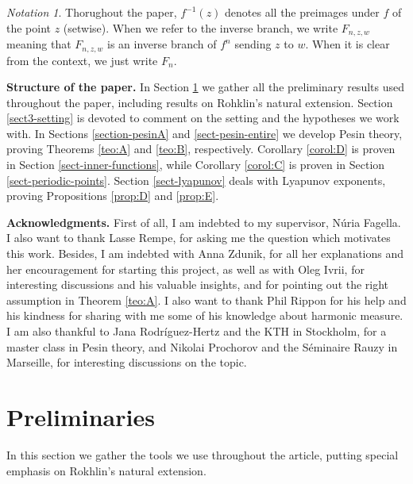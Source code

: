 \documentclass[11pt]{article}
\theoremstyle{definition}
\theoremstyle{remark}
\newtheorem*{notation*}{Notation}
\theoremstyle{plain}
\begin{document}
\begin{notation*}
	 Thorughout the paper, $ f^{-1}(z) $ denotes all the preimages under $ f $ of the point $ z $ (setwise). When we refer to the inverse branch, we write $ F_{n,z,w} $ meaning that $ F_{n,z,w}$ is an inverse branch   of $ f^{n} $ sending $ z $ to $ w $. When it is clear from the context, we  just write $ F_n $.
\end{notation*}


\vspace{0.2cm}
{\bf Structure of the paper.} In
Section \ref{section-preliminaries} we gather all the preliminary results used throughout the paper, including results on Rohklin's natural extension. Section \ref{sect3-setting} is devoted to comment on the setting and the hypotheses we work with.  In Sections \ref{section-pesinA} and \ref{sect-pesin-entire}  we develop  Pesin theory, proving Theorems \ref{teo:A} and \ref{teo:B}, respectively.  Corollary \ref{corol:D} is proven in Section \ref{sect-inner-functions}, while Corollary \ref{corol:C} is proven in Section \ref{sect-periodic-points}. Section \ref{sect-lyapunov} deals with Lyapunov exponents, proving Propositions \ref{prop:D} and \ref{prop:E}.

\vspace{0.2cm}
{\bf Acknowledgments.} First of all, I am indebted to my supervisor, Núria Fagella.
I also want to thank Lasse Rempe, for asking me the question which motivates this work. Besides, I am indebted with Anna Zdunik, for all her explanations and her encouragement for starting this project, as well as with Oleg Ivrii, for   interesting discussions and his valuable insights, and for pointing out the right assumption in Theorem \ref{teo:A}.
I also want to thank Phil Rippon for his help and his kindness for sharing with me  some of his knowledge about harmonic measure. I am also thankful to Jana Rodríguez-Hertz and the KTH in Stockholm, for a master class in Pesin theory, and Nikolai Prochorov and the Séminaire Rauzy  in Marseille, for interesting discussions on the topic.


\section{Preliminaries}\label{section-preliminaries}

In this section we gather the tools we use throughout the article, putting special emphasis on Rokhlin's natural extension.  %
\end{document}

